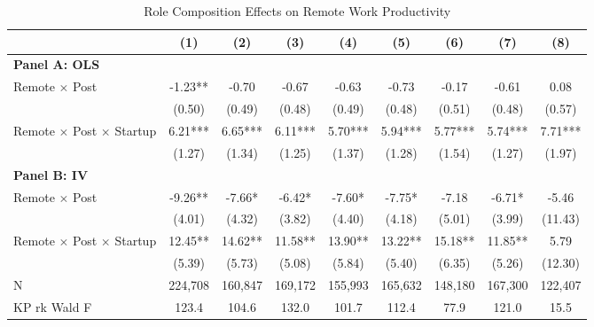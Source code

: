 \documentclass[11pt]{article}
\begin{document}
\begin{table}[H]
\centering
\caption{Role Composition Effects on Remote Work Productivity}
\label{tab:role_composition}
\begin{adjustbox}{width=\textwidth}
\begin{tabular}{l*{8}{c}}
\toprule
 & (1) & (2) & (3) & (4) & (5) & (6) & (7) & (8) \\
\midrule
\multicolumn{9}{l}{\textbf{Panel A: OLS}} \\
\addlinespace
Remote $\times$ Post & -1.23** & -0.70 & -0.67 & -0.63 & -0.73 & -0.17 & -0.61 & 0.08 \\
 & (0.50) & (0.49) & (0.48) & (0.49) & (0.48) & (0.51) & (0.48) & (0.57) \\
\addlinespace[0.5em]
Remote $\times$ Post $\times$ Startup & 6.21*** & 6.65*** & 6.11*** & 5.70*** & 5.94*** & 5.77*** & 5.74*** & 7.71*** \\
 & (1.27) & (1.34) & (1.25) & (1.37) & (1.28) & (1.54) & (1.27) & (1.97) \\

\midrule
\multicolumn{9}{l}{\textbf{Panel B: IV}} \\
\addlinespace
Remote $\times$ Post & -9.26** & -7.66* & -6.42* & -7.60* & -7.75* & -7.18 & -6.71* & -5.46 \\
 & (4.01) & (4.32) & (3.82) & (4.40) & (4.18) & (5.01) & (3.99) & (11.43) \\
\addlinespace[0.5em]
Remote $\times$ Post $\times$ Startup & 12.45** & 14.62** & 11.58** & 13.90** & 13.22** & 15.18** & 11.85** & 5.79 \\
 & (5.39) & (5.73) & (5.08) & (5.84) & (5.40) & (6.35) & (5.26) & (12.30) \\

\midrule
N & 224,708 & 160,847 & 169,172 & 155,993 & 165,632 & 148,180 & 167,300 & 122,407 \\
KP rk Wald F & 123.4 & 104.6 & 132.0 & 101.7 & 112.4 & 77.9 & 121.0 & 15.5 \\


\end{tabular}
\end{adjustbox}
\end{table}
\end{document}

